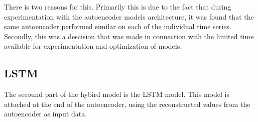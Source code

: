 There is two reasons for this.
Primarily this is due to the fact that during experimentation with the autoencoder models architecture,
it was found that the same autoencoder performed similar on each of the individual time series.
Secondly, this was a descision that was made in connection with the limited time available for experimentation and optimization of models.



\subsection{LSTM}

The secound part of the hybird model is the LSTM model.
This model is attached at the end of the autoencoder,
using the reconstructed values from the autoencoder as input data.




